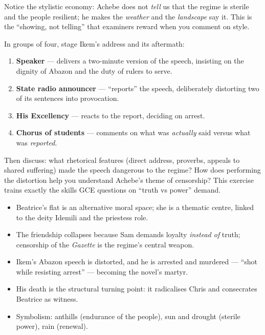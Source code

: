 \documentclass[11pt]{article}
\newcommand{\cle}[1]{{\popxbold\color{popdark}#1}}
\begin{document}
Notice the stylistic economy: Achebe does not \emph{tell} us that the regime is sterile and the people resilient; he makes the \emph{weather} and the \emph{landscape} say it. This is the ``showing, not telling'' that examiners reward when you comment on style.

\begin{experience}
In groups of four, stage Ikem's address and its aftermath:
\begin{enumerate}
\item \textbf{Speaker} — delivers a two-minute version of the speech, insisting on the dignity of Abazon and the duty of rulers to serve.
\item \textbf{State radio announcer} — ``reports'' the speech, deliberately distorting two of its sentences into provocation.
\item \textbf{His Excellency} — reacts to the report, deciding on arrest.
\item \textbf{Chorus of students} — comments on what was \emph{actually} said versus what was \emph{reported}.
\end{enumerate}
Then discuss: what rhetorical features (direct address, proverbs, appeals to shared suffering) made the speech dangerous to the regime? How does performing the distortion help you understand Achebe's theme of \cle{censorship}? This exercise trains exactly the skills GCE questions on ``truth vs power'' demand.
\end{experience}

\begin{aretenir}
\begin{itemize}
\item Beatrice's flat is an alternative moral space; she is a \cle{thematic centre}, linked to the deity \cle{Idemili} and the priestess role.
\item The friendship collapses because Sam demands loyalty \emph{instead of} truth; \cle{censorship} of the \emph{Gazette} is the regime's central weapon.
\item Ikem's Abazon speech is distorted, and he is arrested and murdered — ``shot while resisting arrest'' — becoming the novel's \cle{martyr}.
\item His death is the structural turning point: it radicalises Chris and consecrates Beatrice as witness.
\item Symbolism: anthills (endurance of the people), sun and drought (sterile power), rain (renewal).
\end{itemize}
\end{aretenir}
\end{document}
